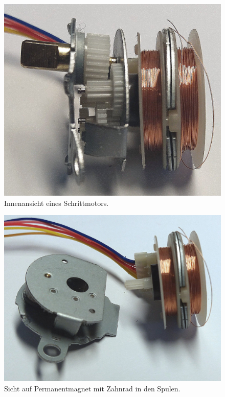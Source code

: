\medskip
\begin{minipage}{0.3\textwidth}
	\begin{figure}[H]
		\includegraphics[width=\textwidth]{./pics/schrittmotor-innen.jpg}
		\caption{Innenansicht eines Schrittmotors.}
	\end{figure}
\end{minipage}
\hfill
\begin{minipage}{0.3\textwidth}
	\begin{figure}[H]
		\includegraphics[width=\textwidth]{./pics/schrittmotor-innen-auseinander.jpg}
		\caption{Sicht auf Permanentmagnet mit Zahnrad in den Spulen.}
	\end{figure}
\end{minipage}
